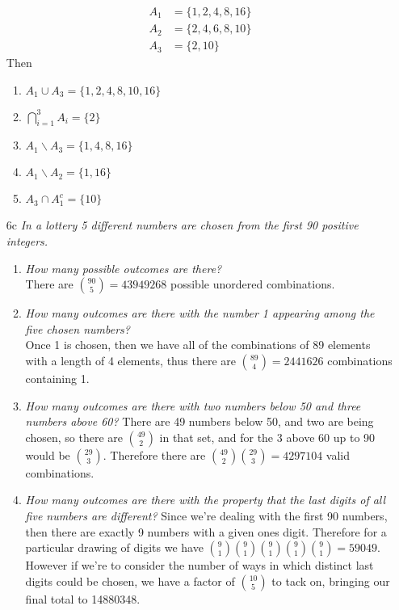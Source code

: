 \documentclass[12pt, letterpaper]{article}
\begin{document}
\begin{enumerate}
\begin{align*}
	A_1 &= \{1, 2, 4, 8, 16\}\\
	A_2 &= \{2, 4, 6, 8, 10\}\\
	A_3 &= \{2, 10\}
	\end{align*}
	Then
	\begin{enumerate}
		\item $A_1 \cup A_3 = \{1, 2, 4, 8, 10, 16\}$
		\item $\bigcap_{i=1}^3 A_i = \{2\}$
		\item $A_1 \backslash A_3 = \{1, 4, 8, 16\}$
		\item $A_1 \backslash A_2 = \{1,16\}$
		\item $A_3 \cap A_1^c = \{10\}$
	\end{enumerate}
	\item[6c]
	\textit{In a lottery 5 different numbers are chosen from the first 90
positive integers.}
	\begin{enumerate}
		\item \textit{How many possible outcomes are there?}\\
		There are $\binom{90}{5} = 43949268$ possible unordered combinations.  
		\item \textit{How many outcomes are there with the number 1 appearing among the
five chosen numbers?}\\
	   Once 1 is chosen, then we have all of the combinations of 89 elements with a length of 4 elements, thus there are $\binom{89}{4} = 2441626$ combinations containing 1.
	   \item \textit{How many outcomes are there with two numbers below 50 and three
numbers above 60?}
		There are 49 numbers below 50, and two are being chosen, so there are $\binom{49}{2}$ in that set, and for the 3 above 60 up to 90 would be $\binom{29}{3}$.  Therefore there are $\binom{49}{2}\binom{29}{3} = 4297104$ valid combinations.  
	   \item \textit{How many outcomes are there with the property that the last digits of all
five numbers are different?}
	     Since we're dealing with the first 90 numbers, then there are exactly 
	     9 numbers with a given ones digit.   Therefore for a particular drawing of digits we have $\binom{9}{1}\binom{9}{1}\binom{9}{1}\binom{9}{1}\binom{9}{1} = 59049$.  However if we're to consider the number of ways in which distinct last digits could be chosen, we have a factor of $\binom{10}{5}$ to tack on, bringing our final total to 14880348.   
	\end{enumerate}
\end{enumerate}
\end{document}
